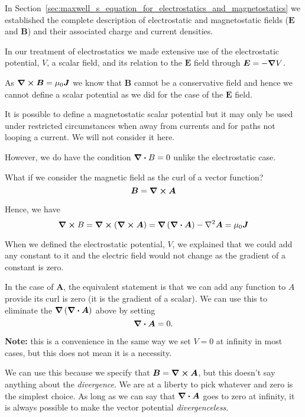 \documentclass[12pt,chapterprefix=false,dvipsnames]{scrbook}
\theoremstyle{dotless}
\theoremstyle{definition}
\begin{document}
In Section~\ref{sec:maxwell_s_equation_for_electrostatics_and_magnetostatics} we established the complete
description of electrostatic and magnetostatic fields
($\bm{E}$ and $\bm{B}$) and their
associated charge and current densities.

In our treatment of electrostatics we made extensive use of the
electrostatic potential, $V$, a scalar
field, and its relation to the $\bm{E}$ field
through $\bm{E} = -\gradient{V}$.

As $\curl{\bm{B}} = \mu_0\bm{J}$ we know that $\bm{B}$
cannot be a conservative field and hence we cannot define a
scalar potential as we did for the case of the
$\bm{E}$ field.

It is possible to define a magnetostatic scalar potential but it
may only be used under restricted circumstances when away from
currents and for paths not looping a current. We will not
consider it here.

However, we do have the condition $\divergence{B} = 0$ unlike
the electrostatic case.

What if we consider the magnetic field as the curl of a vector
function?
\begin{equation}
	\label{eq:magnetic_vector_potential_curl}
	\bm{B} = \curl{\bm{A}}
\end{equation}

Hence, we have
\begin{equation}
	\curl{B} = \curl{\left(\curl{\bm{A}}\right)} =
	\gradient{\left(\divergence{\bm{A}}\right)} - \laplacian{\bm{A}}
	= \mu_0\bm{J}
\end{equation}

When we defined the electrostatic potential,
$V$, we explained that we could add any
constant to it and the electric field would not change as the
gradient of a constant is zero.

In the case of $\bm{A}$, the equivalent statement
is that we can add any function to $A$
provide its curl is zero (it is the gradient of a scalar). We
can use this to eliminate the $\gradient{\left(\divergence{\bm{A}}\right)}$ above by
setting
\begin{equation}
	\label{eq:magnetic_vector_potential_divergence}
	\divergence{\bm{A}} = 0.
\end{equation}

\textbf{Note:} this is a convenience in the same way
we set $V = 0$ at infinity in most cases, but
this does not mean it is a necessity.

We can use this because we specify that $\bm{B} = \curl{\bm{A}}$,
but this doesn't say anything about the
\textit{divergence}. We are at a liberty to pick whatever
and zero is the simplest choice. As long as we can say that
$\divergence{\bm{A}}$ goes to zero at infinity, it is always
possible to make the vector potential \textit{divergenceless}.
\end{document}
